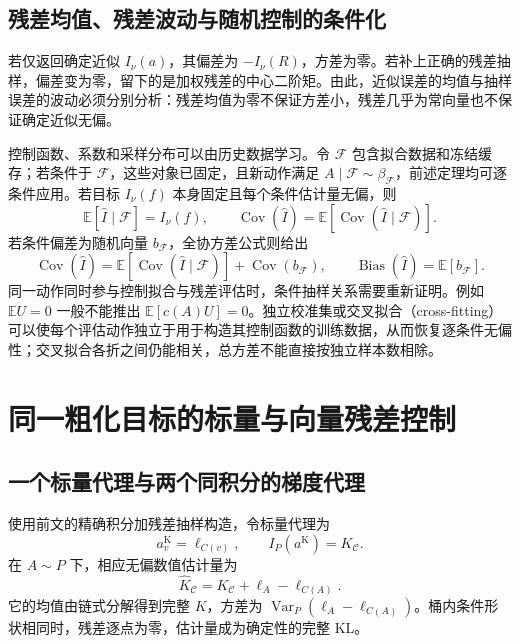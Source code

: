 \documentclass[lang=cn,scheme=chinese,openany]{../book/elegantbook}
\newcommand{\E}{\mathbb E}
\newcommand{\Var}{\operatorname{Var}}
\begin{document}
\subsection{残差均值、残差波动与随机控制的条件化}

若仅返回确定近似 $I_\nu(a)$，其偏差为 $-I_\nu(R)$，方差为零。若补上正确的残差抽样，偏差变为零，留下的是加权残差的中心二阶矩。由此，近似误差的均值与抽样误差的波动必须分别分析：残差均值为零不保证方差小，残差几乎为常向量也不保证确定近似无偏。

控制函数、系数和采样分布可以由历史数据学习。令 $\mathcal F$ 包含拟合数据和冻结缓存；若条件于 $\mathcal F$，这些对象已固定，且新动作满足 $A\mid\mathcal F\sim\beta_{\mathcal F}$，前述定理均可逐条件应用。若目标 $I_\nu(f)$ 本身固定且每个条件估计量无偏，则
\begin{equation*}
 \E[\widehat I\mid\mathcal F]=I_\nu(f),\qquad
 \operatorname{Cov}(\widehat I)=\E[\operatorname{Cov}(\widehat I\mid\mathcal F)].
\end{equation*}
若条件偏差为随机向量 $b_{\mathcal F}$，全协方差公式则给出
\begin{equation*}
 \operatorname{Cov}(\widehat I)
 =\E[\operatorname{Cov}(\widehat I\mid\mathcal F)]+\operatorname{Cov}(b_{\mathcal F}),
 \qquad \operatorname{Bias}(\widehat I)=\E[b_{\mathcal F}].
\end{equation*}
同一动作同时参与控制拟合与残差评估时，条件抽样关系需要重新证明。例如 $\E U=0$ 一般不能推出 $\E[c(A)U]=0$。独立校准集或交叉拟合（cross-fitting）可以使每个评估动作独立于用于构造其控制函数的训练数据，从而恢复逐条件无偏性；交叉拟合各折之间仍能相关，总方差不能直接按独立样本数相除。



\section{同一粗化目标的标量与向量残差控制}
\label{est:partition-controls}
\subsection{一个标量代理与两个同积分的梯度代理}

使用前文的精确积分加残差抽样构造，令标量代理为
\begin{equation*}
 a^{\mathrm K}_v=\ell_{C(v)},\qquad
 I_P(a^{\mathrm K})=K_{\mathcal C}.
\end{equation*}
在 $A\sim P$ 下，相应无偏数值估计量为
\begin{equation*}
 \widehat K_{\mathcal C}
 =K_{\mathcal C}+\ell_A-\ell_{C(A)}.
\end{equation*}
它的均值由链式分解得到完整 $K$，方差为 $\Var_P(\ell_A-\ell_{C(A)})$。桶内条件形状相同时，残差逐点为零，估计量成为确定性的完整 KL。
\end{document}
